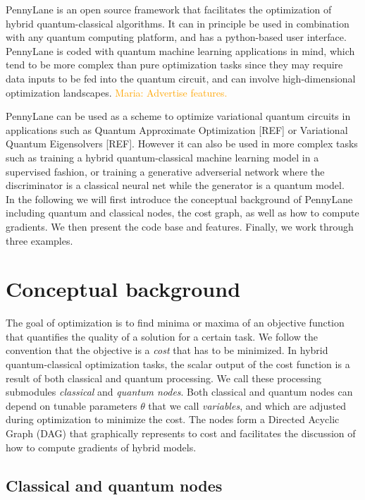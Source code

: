 \documentclass[aps,pra,10pt,twocolumn,groupedaddress,nofootinbib]{revtex4-1}
\theoremstyle{plain}
\newcommand{\maria}[1]{\textcolor{orange}{Maria: #1}}
\begin{document}
PennyLane is an open source framework that facilitates the optimization of hybrid quantum-classical algorithms. It can in principle be used in combination with any quantum computing platform, and has a python-based user interface. PennyLane is coded with quantum machine learning applications in mind, which tend to be more complex than pure optimization tasks since they may require data inputs to be fed into the quantum circuit, and can involve high-dimensional optimization landscapes. \maria{Advertise features.}

PennyLane can be used as a scheme to optimize  variational quantum circuits in applications such as Quantum Approximate Optimization [REF] or Variational Quantum Eigensolvers [REF]. However it can also be used in more complex tasks such as training a hybrid quantum-classical machine learning model in a supervised fashion, or training a generative adverserial network where the discriminator is a classical neural net while the generator is a quantum model. \\

In the following we will first introduce the conceptual background of PennyLane including quantum and classical nodes, the cost graph, as well as how to compute gradients. We then present the code base and features. Finally, we work through three examples.

\section{Conceptual background}

The goal of optimization is to find minima or maxima of an objective function that quantifies the quality of a solution for a certain task. We follow the convention that the objective is a \textit{cost} that has to be minimized. In hybrid quantum-classical optimization tasks, the scalar output of the cost function is a result of both classical and quantum processing. We call these processing submodules \textit{classical} and \textit{quantum nodes}. Both classical and quantum nodes can depend on tunable parameters $\theta$ that we call \textit{variables}, and which are adjusted during optimization to minimize the cost. The nodes form a Directed Acyclic Graph (DAG) that graphically represents to cost and facilitates the discussion of how to compute gradients of hybrid models.

\subsection{Classical and quantum nodes}
\end{document}

